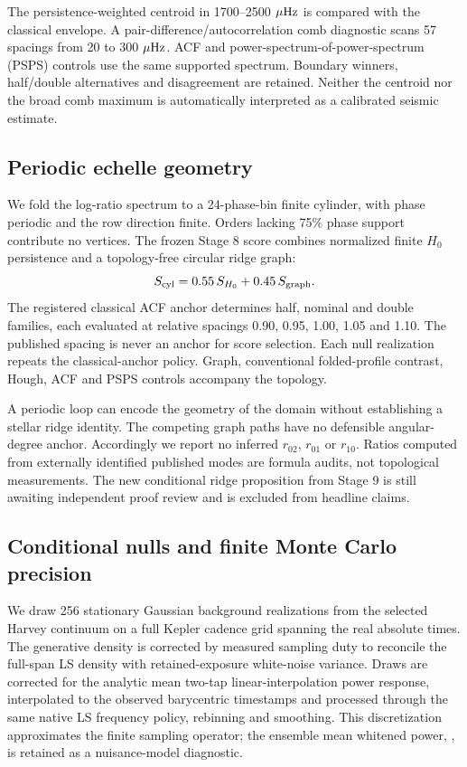 \documentclass[11pt]{article}
\begin{document}
The persistence-weighted centroid in 1700--2500 $\mu{\rm Hz}$ is compared with
the classical envelope. A pair-difference/autocorrelation comb diagnostic scans
57 spacings from 20 to 300 $\mu{\rm Hz}$. ACF and power-spectrum-of-power-spectrum
(PSPS) controls use the same supported spectrum. Boundary winners, half/double
alternatives and disagreement are retained. Neither the centroid nor the broad
comb maximum is automatically interpreted as a calibrated seismic estimate.

\subsection{Periodic echelle geometry}
We fold the log-ratio spectrum to a 24-phase-bin finite cylinder, with phase
periodic and the row direction finite. Orders lacking 75\% phase support
contribute no vertices. The frozen Stage 8 score combines normalized finite
$H_0$ persistence and a topology-free circular ridge graph:
\[
S_{\rm cyl}=0.55\,S_{H_0}+0.45\,S_{\rm graph}.
\]
The registered classical ACF anchor determines half, nominal and double families,
each evaluated at relative spacings 0.90, 0.95, 1.00, 1.05 and 1.10.
The published spacing is never an anchor for score selection. Each null
realization repeats the classical-anchor policy. Graph, conventional folded-profile
contrast, Hough, ACF and PSPS controls accompany the topology.

A periodic loop can encode the geometry of the domain without establishing a
stellar ridge identity. The competing graph paths have no defensible angular-degree
anchor. Accordingly we report no inferred $r_{02}$, $r_{01}$ or $r_{10}$.
Ratios computed from externally identified published modes are formula audits,
not topological measurements. The new conditional ridge proposition from Stage 9
is still awaiting independent proof review and is excluded from headline claims.

\subsection{Conditional nulls and finite Monte Carlo precision}
We draw 256 stationary Gaussian background realizations from the selected Harvey
continuum on a full Kepler cadence grid spanning the real absolute times.
The generative density is corrected by measured sampling duty to reconcile the
full-span LS density with retained-exposure white-noise variance. Draws are
corrected for the analytic mean two-tap linear-interpolation power response,
interpolated to the observed barycentric timestamps and processed through the
same native LS frequency policy, rebinning and smoothing.
This discretization approximates the finite sampling operator; the ensemble
mean whitened power, \NullMeanRatio, is retained as a nuisance-model diagnostic.
\end{document}
